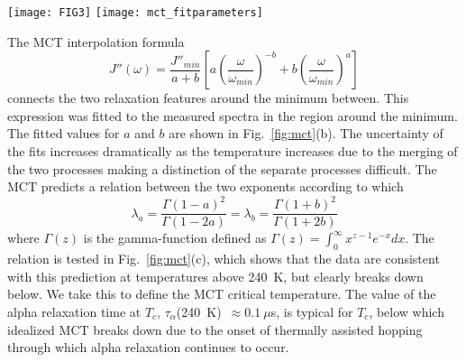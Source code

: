 \documentclass[reprint,showpacs,amsmath,amssymb,aip,jcp]{revtex4-1}
\begin{document}
\begin{figure*}
  \begin{center}
    \texttt{[image: FIG3]}\hspace{.5cm}
    \texttt{[image: mct\_fitparameters]}
  \end{center}
  \caption{\label{fig:mct} (a) The characteristic alpha relaxation
    time plotted as a function of inverse temperature where the
    Arrhenius equation gives a straight line. The glass transition
    temperature is at $T_g \cong$ 210~K. The VFT equation was fitted
    to all data points (full line) yielding $\log\tau_0 = -15.0\pm
    0.8$, $D=6\pm 1$ and $T_0 = 183 \pm 5$~K. The MCT critical
    temperature $T_c = 240$~K was identified from (b) as the temperature
    below which MCT predictions clearly break down; the MCT power-law
    fit to the high-temperature points $(T > T_c)$ (marked by central
    black dots) yielded the following fit parameters:
    $\log(\tau_x/\text{s}) = -12.0\pm 0.5$, $\gamma = 2.7\pm 0.4$. (b)
    Values of powerlaw exponents $a$ and $b$ over a wide temperature
    range, determined as fitting parameters to Eq. (3). (c) Test of
    the MCT prediction in Eq.~(\ref{eq:lambda}) that $\lambda_a =
    \lambda_b$. The test is useful over the 240--248~K temperature
    range. (d) The calculated exponent $\gamma$ as a function of
    temperature. The green dotted line shows the value of obtained
    from fitting Eq.~(\ref{eq:tau}) to the relaxation times (in (d))
    and the green area gives the estimated uncertainty on this value.}
\end{figure*}

The MCT interpolation formula \cite{Cummins1993}
\begin{equation}\label{eq:min}
  J''(\omega)=\frac{J''_{min}}{a+b}
  \left[a\left(\frac{\omega}{\omega_{min}}\right)^{-b} +
    b\left(\frac{\omega}{\omega_{min}}\right)^a\right] 
\end{equation}
connects the two relaxation features around the minimum between. This
expression was fitted to the measured spectra in the region around the
minimum. The fitted values for $a$ and $b$ are shown in
Fig.~\ref{fig:mct}(b). The uncertainty of the fits increases
dramatically as the temperature increases due to the merging of the
two processes making a distinction of the separate processes
difficult. The MCT predicts a relation between the two exponents
according to which
\begin{equation}\label{eq:lambda}
  \lambda_a = \frac{\Gamma(1-a)^2}{\Gamma(1-2a)}=\lambda_b =
  \frac{\Gamma(1+b)^2}{\Gamma(1+2b)}
\end{equation}
where $\Gamma(z)$ is the gamma-function defined as $\Gamma(z)
=\int_0^{\infty}x^{z-1}e^{-x}dx$. The relation is tested in
Fig.~\ref{fig:mct}(c), which shows that the data are consistent with
this prediction at temperatures above 240~K, but clearly breaks down
below. We take this to define the MCT critical temperature. The value
of the alpha relaxation time at $T_c$, $\tau_{\alpha}$(240~K)~$\approx
0.1~\mu$s, is typical for $T_c$, below which idealized MCT breaks down
\cite{Das2004} due to the onset of thermally assisted hopping
\cite{Goldstein1969,Debenedetti2001,Schroder2000} through which alpha
relaxation continues to occur.
\end{document}
